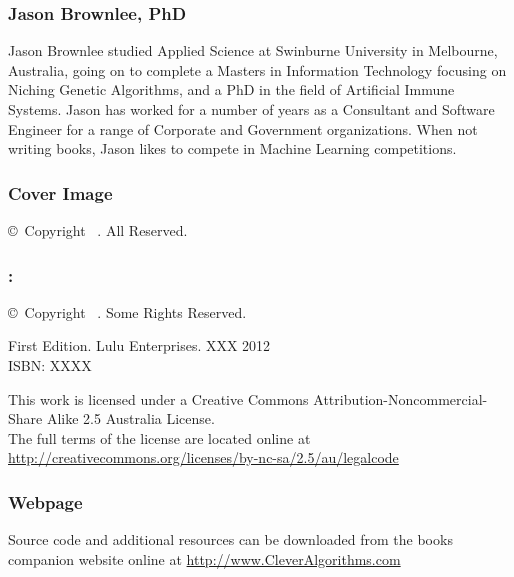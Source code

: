 

\vspace*{\fill}
\begin{flushleft}
\begin{small}

\subsubsection*{Jason Brownlee, PhD}
Jason Brownlee studied Applied Science at Swinburne University in Melbourne, Australia, going on to complete a Masters in Information Technology focusing on Niching Genetic Algorithms, and a PhD in the field of Artificial Immune Systems. Jason has worked for a number of years as a Consultant and Software Engineer for a range of Corporate and Government organizations. When not writing books, Jason likes to compete in Machine Learning competitions.

\subsubsection*{Cover Image}
\copyright\ Copyright \mybookdate\ \mybookauthor. All Reserved. \\
\vspace{0.5cm}

\subsubsection*{\mybooktitle: \mybooksubtitle}
\copyright\ Copyright \mybookdate\ \mybookauthor. Some Rights Reserved. \\
\vspace{0.5cm}

First Edition. Lulu Enterprises. XXX 2012  \\
ISBN: XXXX \\
\vspace{0.5cm}

This work is licensed under a Creative Commons Attribution\--Noncommercial\--Share Alike 2.5 Australia License. \\
The full terms of the license are located online at \url{http://creativecommons.org/licenses/by-nc-sa/2.5/au/legalcode} \\
\vspace{0.5cm}

\subsubsection*{Webpage}
Source code and additional resources can be downloaded from the books companion website online at \url{http://www.CleverAlgorithms.com}

\end{small}
\end{flushleft}

